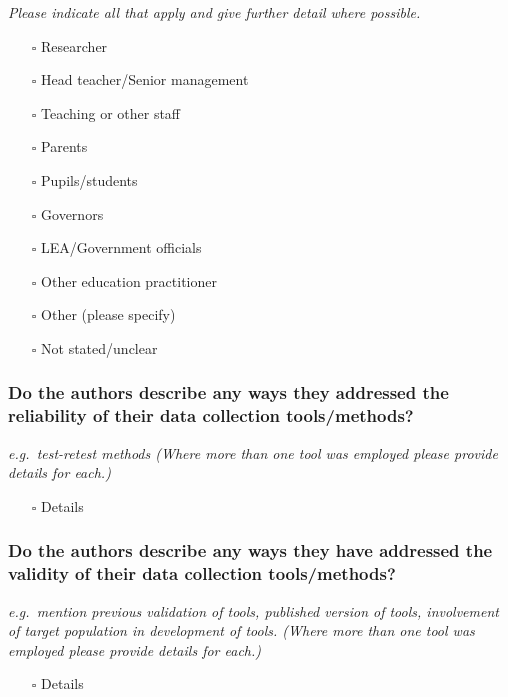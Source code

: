 \documentclass[
  doc, a4paper]{apa7}
\providecommand{\tightlist}{%
  \setlength{\itemsep}{0pt}\setlength{\parskip}{0pt}}
\begin{document}
\emph{Please indicate all that apply and give further detail where possible.}

\begin{itemize}
\tightlist
\item[$\square$]
  Researcher
\item[$\square$]
  Head teacher/Senior management
\item[$\square$]
  Teaching or other staff
\item[$\square$]
  Parents
\item[$\square$]
  Pupils/students
\item[$\square$]
  Governors
\item[$\square$]
  LEA/Government officials
\item[$\square$]
  Other education practitioner
\item[$\square$]
  Other (please specify)
\item[$\square$]
  Not stated/unclear
\end{itemize}

\subsubsection{Do the authors describe any ways they addressed the reliability of their data collection tools/methods?}\label{do-the-authors-describe-any-ways-they-addressed-the-reliability-of-their-data-collection-toolsmethods}

\emph{e.g.~test-retest methods (Where more than one tool was employed please provide details for each.)}

\begin{itemize}
\tightlist
\item[$\square$]
  Details
\end{itemize}

\subsubsection{Do the authors describe any ways they have addressed the validity of their data collection tools/methods?}\label{do-the-authors-describe-any-ways-they-have-addressed-the-validity-of-their-data-collection-toolsmethods}

\emph{e.g.~mention previous validation of tools, published version of tools, involvement of target population in development of tools. (Where more than one tool was employed please provide details for each.)}

\begin{itemize}
\tightlist
\item[$\square$]
  Details
\end{itemize}
\end{document}
